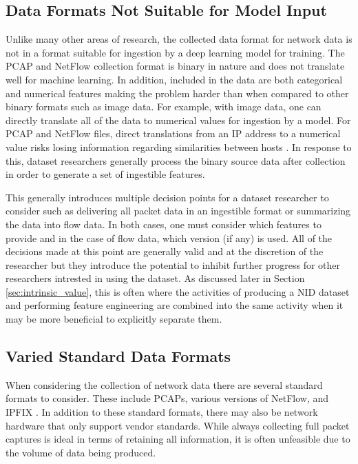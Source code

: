 \documentclass[sigconf]{acmart}
\begin{document}
\subsection{Data Formats Not Suitable for Model Input}\label{subsec:collectionformat}
Unlike many other areas of research, the collected data format for network data is not in a format suitable for ingestion by a deep learning model for training.
The PCAP and NetFlow collection format is binary in nature and does not translate well for machine learning.
In addition, included in the data are both categorical and numerical features making the problem harder than when compared to other binary formats such as image data. 
For example, with image data, one can directly translate all of the data to numerical values for ingestion by a model.
For PCAP and NetFlow files, direct translations from an IP address to a numerical value risks losing information regarding similarities between hosts \cite{ringip2vec}.
In response to this, dataset researchers generally process the binary source data after collection in order to generate a set of ingestible features.

This generally introduces multiple decision points for a dataset researcher to consider such as delivering all packet data in an ingestible format or summarizing the data into flow data. 
In both cases, one must consider which features to provide and in the case of flow data, which version (if any) is used.
All of the decisions made at this point are generally valid and at the discretion of the researcher but they introduce the potential to inhibit further progress for other researchers intrested in using the dataset.
As discussed later in Section \ref{sec:intrinsic_value}, this is often where the activities of producing a NID dataset and performing feature engineering are combined into the same activity when it may be more beneficial to explicitly separate them.

\subsection{Varied Standard Data Formats}\label{subsec:nostandard}
When considering the collection of network data there are several standard formats to consider.
These include PCAPs, various versions of NetFlow, and IPFIX \cite{claise2008specification}.
In addition to these standard formats, there may also be network hardware that only support vendor standards.
While always collecting full packet captures is ideal in terms of retaining all information, it is often unfeasible due to the volume of data being produced.
\end{document}
